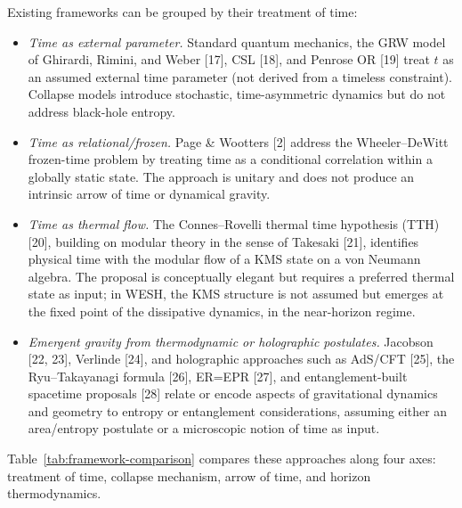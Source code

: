 \documentclass[12pt,a4paper]{article}
\numberwithin{equation}{section}
\begin{document}
\vspace{0.3cm}
\noindent Existing frameworks can be grouped by their treatment of time:

\begin{itemize}[leftmargin=1.2cm, itemsep=0.15cm]
\item[\textbf{(A)}] \textit{Time as external parameter.} Standard quantum mechanics, the GRW model of Ghirardi, Rimini, and Weber [17], CSL [18], and Penrose OR [19] treat $t$ as an assumed external time parameter (not derived from a timeless constraint). Collapse models introduce stochastic, time-asymmetric dynamics but do not address black-hole entropy.

\item[\textbf{(B)}] \textit{Time as relational/frozen.} Page \& Wootters [2] address the Wheeler--DeWitt frozen-time problem by treating time as a conditional correlation within a globally static state. The approach is unitary and does not produce an intrinsic arrow of time or dynamical gravity.

\item[\textbf{(B$'$)}] \textit{Time as thermal flow.} The Connes--Rovelli thermal time hypothesis (TTH) [20], building on modular theory in the sense of Takesaki [21], identifies physical time with the modular flow of a KMS state on a von Neumann algebra. The proposal is conceptually elegant but requires a preferred thermal state as input; in WESH, the KMS structure is not assumed but emerges at the fixed point of the dissipative dynamics, in the near-horizon regime.

\item[\textbf{(C)}] \textit{Emergent gravity from thermodynamic or holographic postulates.} Jacobson [22, 23], Verlinde [24], and holographic approaches such as AdS/CFT [25], the Ryu--Takayanagi formula [26], ER=EPR [27], and entanglement-built spacetime proposals [28] relate or encode aspects of gravitational dynamics and geometry to entropy or entanglement considerations, assuming either an area/entropy postulate or a microscopic notion of time as input.
\end{itemize}

\medskip
\noindent Table~\ref{tab:framework-comparison} compares these approaches along four axes: treatment of time, collapse mechanism, arrow of time, and horizon thermodynamics.

\vspace{0.3cm}
\end{document}
